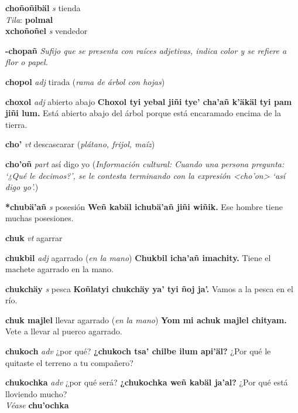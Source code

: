 \documentclass[10pt]{scrbook}
\newcommand{\entry}[1]{\textbf{#1}}
\newcommand{\nontranslationdef}[1]{\textit{#1}}
\newcommand{\partofspeech}[1]{\textit{#1}}
\newcommand{\spanishtranslation}[1]{#1}
\newcommand{\clarification}[1]{(\textit{#1})}
\newcommand{\cholexample}[1]{\textbf{#1}}
\newcommand{\exampletranslation}[1]{#1}
\newcommand{\dialectvariant}[1]{\\\textit{#1}:}
\newcommand{\dialectword}[1]{\textbf{#1}}
\newcommand{\alsosee}[1]{\\\textit{Véase} \textbf{#1}}
\newcommand{\culturalinformation}[1]{(\textit{#1})}
\newcommand{\secondaryentry}[1]{\\\textbf{#1}}
\newcommand{\secondpartofspeech}[1]{\textit{#1}}
\newcommand{\secondtranslation}[1]{#1}
\begin{document}
\begin{multicols}{2}
\entry{choñoñibäl}
\partofspeech{s}
\spanishtranslation{tienda}
\dialectvariant{Tila}
\dialectword{polmal}
\secondaryentry{xchoñoñel}
\secondpartofspeech{s}
\secondtranslation{vendedor}

\entry{-chopañ}
\nontranslationdef{Sufijo que se presenta con raíces adjetivas, indica color y se refiere a flor o papel.}

\entry{chopol}
\partofspeech{adj}
\spanishtranslation{tirada}
\clarification{rama de árbol con hojas}

\entry{choxol}
\partofspeech{adj}
\spanishtranslation{abierto abajo}
\cholexample{Choxol tyi yebal jiñi tye' cha'añ k'äkäl tyi pam jiñi lum.}
\exampletranslation{Está abierto abajo del árbol porque está encaramado encima de la tierra.}

\entry{cho'}
\partofspeech{vt}
\spanishtranslation{descascarar}
\clarification{plátano, frijol, maíz}

\entry{cho'oñ}
\partofspeech{part}
\spanishtranslation{así digo yo}
\culturalinformation{Información cultural: Cuando una persona pregunta: ‘¿Qué le decimos?’, se le contesta terminando con la expresión <cho'on> ‘así digo yo’.}

\entry{*chubä'añ}
\partofspeech{s}
\spanishtranslation{posesión}
\cholexample{Weñ kabäl ichubä'añ jiñi wiñik.}
\exampletranslation{Ese hombre tiene muchas posesiones.}

\entry{chuk}
\partofspeech{vt}
\spanishtranslation{agarrar}

\entry{chukbil}
\partofspeech{adj}
\spanishtranslation{agarrado}
\clarification{en la mano}
\cholexample{Chukbil icha'añ imachity.}
\exampletranslation{Tiene el machete agarrado en la mano.}

\entry{chukchäy}
\partofspeech{s}
\spanishtranslation{pesca}
\cholexample{Koñlatyi chukchäy ya' tyi ñoj ja'.}
\exampletranslation{Vamos a la pesca en el río.}

\entry{chuk majlel}
\spanishtranslation{llevar agarrado}
\clarification{en la mano}
\cholexample{Yom mi achuk majlel chityam.}
\exampletranslation{Vete a llevar al puerco agarrado.}

\entry{chukoch}
\partofspeech{adv}
\spanishtranslation{¿por qué?}
\cholexample{¿chukoch tsa' chilbe ilum api'äl?}
\exampletranslation{¿Por qué le quitaste el terreno a tu compañero?}

\entry{chukochka}
\partofspeech{adv}
\spanishtranslation{¿por qué será?}
\cholexample{¿chukochka weñ kabäl ja'al?}
\exampletranslation{¿Por qué está lloviendo mucho?}
\alsosee{chu'ochka}


\end{multicols}
\end{document}
